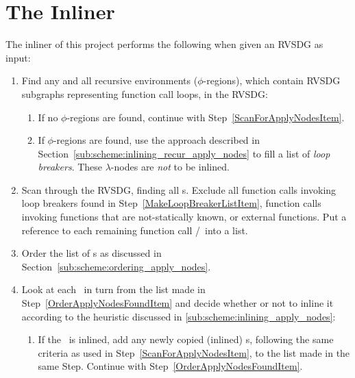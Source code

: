 
\clearpage
\section{The Inliner}
\label{scheme:start}


The inliner of this project performs the following when given an RVSDG as input:

\begin{enumerate}

	\item Find any and all recursive environments ($\phi$-regions), which
contain RVSDG subgraphs representing function call loops, in the RVSDG:

	\begin{enumerate}
		\item If no $\phi$-regions are found, continue with
Step~\ref{ScanForApplyNodesItem}.

		\item If $\phi$-regions are found, use the approach described
in Section~\ref{sub:scheme:inlining_recur_apply_nodes} to fill a list of
\textit{loop breakers}. These $\lambda$-nodes are \textit{not} to be inlined.
		\label{MakeLoopBreakerListItem}
	\end{enumerate}

	\item Scan through the RVSDG, finding all \applyNode s. Exclude all function
calls invoking loop breakers found in Step~\ref{MakeLoopBreakerListItem},
function calls invoking functions that are not-statically known, or external
functions. Put a reference to each remaining function call /\applyNode~into a
list.
	\label{ScanForApplyNodesItem}

	\item Order the list of \applyNode s as discussed in
Section~\ref{sub:scheme:ordering_apply_nodes}.
	\label{OrderApplyNodesFoundItem}

	\item Look at each \applyNode~in turn from the list made in
Step~\ref{OrderApplyNodesFoundItem} and decide whether or not to inline it
according to the heuristic discussed in \ref{sub:scheme:inlining_apply_nodes}:
	\label{LookAtNextCallSiteItem}

	\begin{enumerate}
		\item If the \applyNode~is inlined, add any newly copied (inlined)
\applyNode s, following the same criteria as used in
Step~\ref{ScanForApplyNodesItem}, to the list made in the same Step. Continue
with Step~\ref{OrderApplyNodesFoundItem}.


\end{enumerate}
\end{enumerate}
